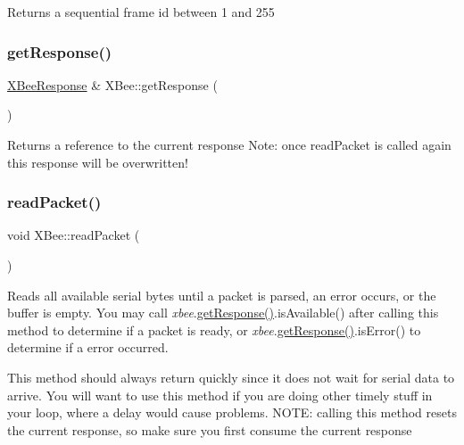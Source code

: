 Returns a sequential frame id between 1 and 255 \hypertarget{class_x_bee_a18250def80e8b643aa1ccc15a98937f3}{}\label{class_x_bee_a18250def80e8b643aa1ccc15a98937f3} 
\subsubsection{\texorpdfstring{get\+Response()}{getResponse()}}
{\footnotesize\ttfamily \hyperlink{class_x_bee_response}{X\+Bee\+Response} \& X\+Bee\+::get\+Response (\begin{DoxyParamCaption}{ }\end{DoxyParamCaption})}

Returns a reference to the current response Note\+: once read\+Packet is called again this response will be overwritten! \hypertarget{class_x_bee_a7d788232f44e8b3c10dc686a0299fcc6}{}\label{class_x_bee_a7d788232f44e8b3c10dc686a0299fcc6} 
\subsubsection{\texorpdfstring{read\+Packet()}{readPacket()}\hspace{0.1cm}{\footnotesize\ttfamily [1/2]}}
{\footnotesize\ttfamily void X\+Bee\+::read\+Packet (\begin{DoxyParamCaption}{ }\end{DoxyParamCaption})}

Reads all available serial bytes until a packet is parsed, an error occurs, or the buffer is empty. You may call {\itshape xbee}.\hyperlink{class_x_bee_a18250def80e8b643aa1ccc15a98937f3}{get\+Response()}.is\+Available() after calling this method to determine if a packet is ready, or {\itshape xbee}.\hyperlink{class_x_bee_a18250def80e8b643aa1ccc15a98937f3}{get\+Response()}.is\+Error() to determine if a error occurred. 

This method should always return quickly since it does not wait for serial data to arrive. You will want to use this method if you are doing other timely stuff in your loop, where a delay would cause problems. N\+O\+TE\+: calling this method resets the current response, so make sure you first consume the current response \hypertarget{class_x_bee_ae1c9f3b53df50564ab9aca2716792b44}{}\label{class_x_bee_ae1c9f3b53df50564ab9aca2716792b44} 

